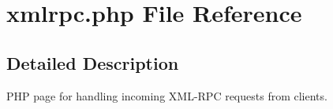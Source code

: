 \hypertarget{xmlrpc_8php}{
\section{xmlrpc.php File Reference}
\label{xmlrpc_8php}
}


\subsection{Detailed Description}
PHP page for handling incoming XML-RPC requests from clients. 